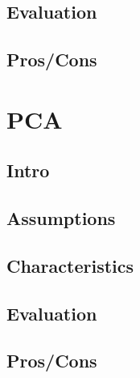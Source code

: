 \documentclass[]{book}
\begin{document}
\subsection{Evaluation}\label{evaluation-1}

\subsection{Pros/Cons}\label{proscons-1}

\section{PCA}\label{pca}

\subsection{Intro}\label{intro-2}

\subsection{Assumptions}\label{assumptions-2}

\subsection{Characteristics}\label{characteristics-1}

\subsection{Evaluation}\label{evaluation-2}

\subsection{Pros/Cons}\label{proscons-2}
\end{document}
